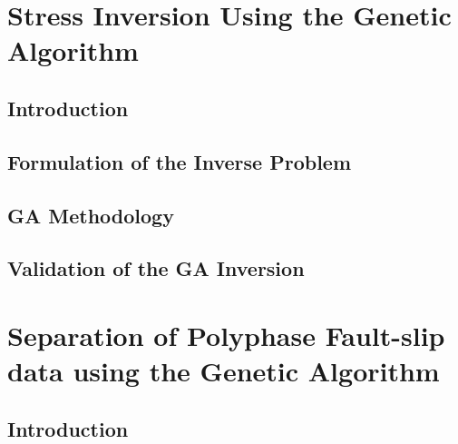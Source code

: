 \documentclass[12pt, oneside]{book}
\begin{document}
\listoffigures

\listoftables

\mainmatter

\fancyhead{}  %
\pagestyle{fancy}
\rhead{\thepage}  %
\cfoot{}

\cleardoublepage
\begingroup
  \makeatletter
  \let\ps@plain\ps@empty
  \part{ Stress Inversion Using the Genetic Algorithm}
\endgroup

\chapter{Introduction}
\thispagestyle{empty}


\chapter{Formulation of the Inverse Problem}
\thispagestyle{empty}


\chapter{GA Methodology}
\thispagestyle{empty}


\chapter{Validation of the GA Inversion}
\thispagestyle{empty}


\cleardoublepage
\begingroup
  \makeatletter
  \let\ps@plain\ps@empty
  \part{Separation of Polyphase Fault-slip data using the Genetic Algorithm}
\endgroup

\chapter{Introduction}
\thispagestyle{empty}

\end{document}
